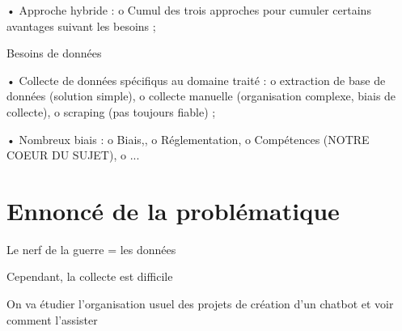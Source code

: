 \begin{todolist}
            •	Approche hybride :
                o   Cumul des trois approches pour cumuler certains avantages suivant les besoins ;

        \item Besoins de données

            •	Collecte de données spécifiqus au domaine traité :
                o   extraction de base de données (solution simple),
                o   collecte manuelle (organisation complexe, biais de collecte),
                o   scraping (pas toujours fiable) ;

            •	Nombreux biais :
                o   Biais,,
                o   Réglementation,
                o   Compétences (NOTRE COEUR DU SUJET),
                o   ...
    \end{todolist}

    \section{Ennoncé de la problématique}

    \begin{todolist}
        \item Le nerf de la guerre = les données
        \item Cependant, la collecte est difficile
        \item On va étudier l'organisation usuel des projets de création d'un chatbot et voir comment l'assister
    \end{todolist}
